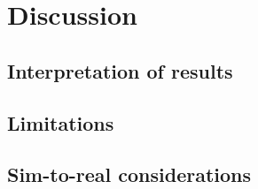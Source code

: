 \section{Discussion}
\label{sec:discussion}

\subsection{Interpretation of results}

\subsection{Limitations}

\subsection{Sim-to-real considerations}

